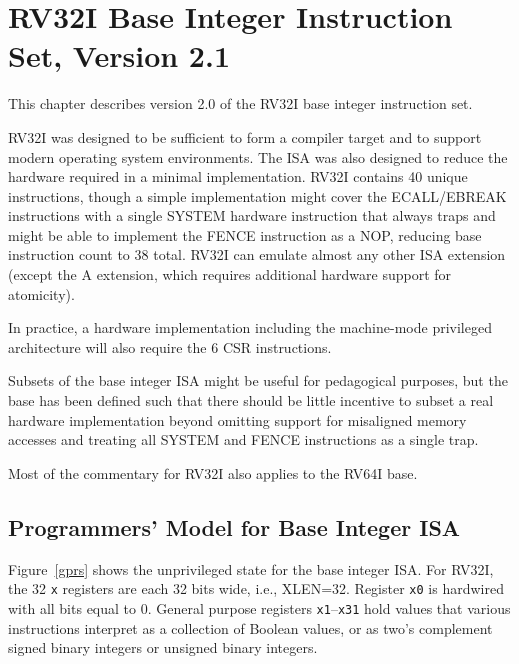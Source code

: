 \chapter{RV32I Base Integer Instruction Set, Version 2.1}
\label{rv32}

This chapter describes version 2.0 of the RV32I base integer
instruction set.

\begin{commentary}
RV32I was designed to be sufficient to form a compiler target and to
support modern operating system environments.  The ISA was also
designed to reduce the hardware required in a minimal implementation.
RV32I contains 40 unique instructions, though a simple implementation
might cover the ECALL/EBREAK instructions with a single SYSTEM
hardware instruction that always traps and might be able to implement
the FENCE instruction as a NOP, reducing base instruction count to 38
total.  RV32I can emulate almost any other ISA extension (except the A
extension, which requires additional hardware support for atomicity).

In practice, a hardware implementation including the machine-mode
privileged architecture will also require the 6 CSR instructions.

Subsets of the base integer ISA might be useful for pedagogical
purposes, but the base has been defined such that there should be
little incentive to subset a real hardware implementation beyond
omitting support for misaligned memory accesses and treating all
SYSTEM and FENCE instructions as a single trap.
\end{commentary}

\begin{commentary}
Most of the commentary for RV32I also applies to the RV64I base.
\end{commentary}

\section{Programmers' Model for Base Integer ISA}

Figure~\ref{gprs} shows the unprivileged state for the base integer
ISA.  For RV32I, the 32 {\tt x} registers are each 32 bits wide, i.e.,
XLEN=32.  Register {\tt x0} is hardwired with all bits equal to 0.
General purpose registers {\tt x1}--{\tt x31} hold values that various
instructions interpret as a collection of Boolean values, or as two's
complement signed binary integers or unsigned binary integers.


